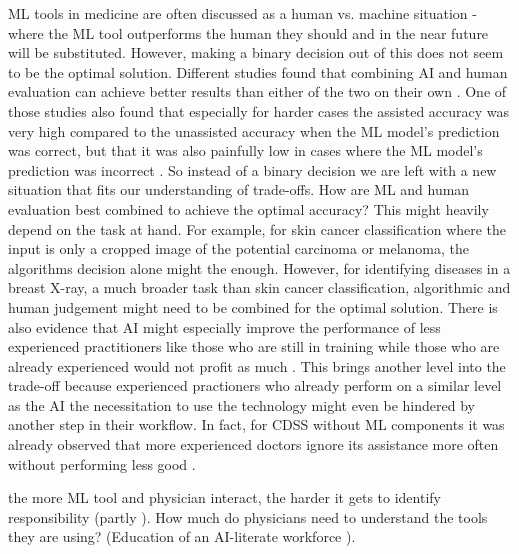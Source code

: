 ML tools in medicine are often discussed as a human vs. machine situation - where the ML tool outperforms the human they should and in the near future will be substituted. However, making a binary decision out of this does not seem to be the optimal solution. Different studies found that combining AI and human evaluation can achieve better results than either of the two on their own \cite{rajpurkar2022ai, kiani2020impact, topol2019high, steiner2018impact}. One of those studies also found that especially for harder cases the assisted accuracy was very high compared to the unassisted accuracy when the ML model's prediction was correct, but that it was also painfully low in cases where the ML model's prediction was incorrect \cite{kiani2020impact}. So instead of a binary decision we are left with a new situation that fits our understanding of trade-offs. How are ML and human evaluation best combined to achieve the optimal accuracy? This might heavily depend on the task at hand. For example, for skin cancer classification where the input is only a cropped image of the potential carcinoma or melanoma, the algorithms decision alone might the enough. However, for identifying diseases in a breast X-ray, a much broader task than skin cancer classification, algorithmic and human judgement might need to be combined for the optimal solution.
There is also evidence that AI might especially improve the performance of less experienced practitioners like those who are still in training while those who are already experienced would not profit as much \cite{rajpurkar2022ai}. This brings another level into the trade-off because experienced practioners who already perform on a similar level as the AI the necessitation to use the technology might even be hindered by another step in their workflow. In fact, for CDSS without ML components it was already observed that more experienced doctors ignore its assistance more often without performing less good \cite{sutton2020overview}.

the more ML tool and physician interact, the harder it gets to identify responsibility (partly \cite{horgan2019artificial}).
How much do physicians need to understand the tools they are using? (Education of an AI-literate workforce \cite{he2019practical}).


